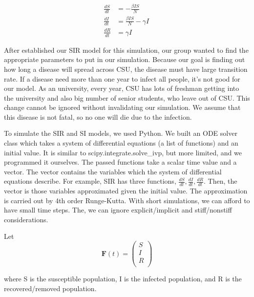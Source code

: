 \documentclass[12pt]{article}
\newcommand{\Fv}{\mathbf{F}}
\begin{document}
\begin{subequations}
    \label{eq:sys}
    \begin{align}
        \frac{dS}{dt} &= -\frac{\beta I S}{N}\, \label{eq:ds} \\
        \frac{dI}{dt} &= \frac{\beta I S}{N} - \gamma I\, \label{eq:di} \\
        \frac{dR}{dt} &= \gamma I\, \label{eq:dr}
    \end{align}
\end{subequations}
    
After established our SIR model for this simulation, our group wanted to find the appropriate parameters to put in our simulation. Because our goal is finding out how long a disease will spread across CSU, the disease must have large transition rate. If a disease need more than one year to infect all people, it’s not good for our model. As an university, every year, CSU has lots of freshman getting into the university and also big number of senior students, who leave out of CSU. This change cannot be ignored without invalidating our simulation.  We assume that this disease is not fatal, so no one will die due to the infection.

To simulate the SIR and SI models, we used Python. We built an ODE solver class which takes a system of differential equations (a list of functions) and an initial value. It is similar to scipy.integrate.solve\_ivp, but more limited, and we programmed it ourselves. The passed functions take a scalar time value and a vector. The vector contains the variables which the system of differential equations describe. For example, SIR has three functions, $\frac{dS}{dt}, \frac{dI}{dt}, \frac{dR}{dt}$. Then, the vector is those variables approximated given the initial value. The approximation is carried out by 4th order Runge-Kutta. With short simulations, we can afford to have small time steps. The, we can ignore explicit/implicit and stiff/nonstiff considerations.

Let
\begin{equation}
    \Fv(t) = 
    \left(
    \begin{matrix}
        S \\
        I \\
        R \\
    \end{matrix}
    \right)
\end{equation}

where S is the susceptible population, I is the infected population, and R is the recovered/removed population.
\end{document}
